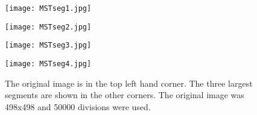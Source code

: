 \vfill
\begin{figure}[ht]
\begin{minipage}[b]{0.47\linewidth}
\centering
\texttt{[image: MSTseg1.jpg]}
\end{minipage}
\hspace{0.5cm}
\begin{minipage}[b]{0.47\linewidth}
\centering
\texttt{[image: MSTseg2.jpg]}
\end{minipage}
\begin{minipage}[b]{0.47\linewidth}
\centering
\texttt{[image: MSTseg3.jpg]}
\end{minipage}
\hspace{0.5cm}
\begin{minipage}[b]{0.47\linewidth}
\centering
\texttt{[image: MSTseg4.jpg]}
\end{minipage}
\caption{The original image is in the top left hand corner. The three largest segments are shown in the other corners. The original image was 498x498 and 50000 divisions were used.}
\label{mst:segmented}
\end{figure}
\vfill 